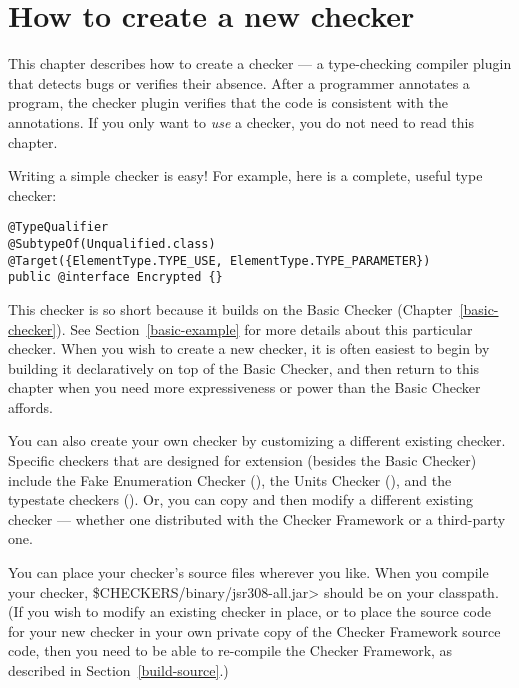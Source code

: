 \htmlhr
\chapter{How to create a new checker\label{writing-a-checker}}

\newcommand{\TreeAPIBase}{http://docs.oracle.com/javase/7/docs/jdk/api/javac/tree/com/sun/source}
\newcommand{\refTreeclass}[2]{\ahref{\TreeAPIBase{}/#1/#2.html?is-external=true}{\<#2>}}
\newcommand{\ModelAPIBase}{http://docs.oracle.com/javase/7/docs/api/javax/lang/model}
\newcommand{\refModelclass}[2]{\ahref{\ModelAPIBase{}/#1/#2.html?is-external=true}{\<#2>}}

This chapter describes how to create a checker
--- a type-checking compiler plugin that detects bugs or verifies their
absence.  After a programmer annotates a program,
the checker plugin verifies that the code is consistent
with the annotations.
If you only want to \emph{use} a checker, you do not need to read this
chapter.

Writing a simple checker is easy!  For example, here is a complete, useful
type checker:

\begin{Verbatim}
@TypeQualifier
@SubtypeOf(Unqualified.class)
@Target({ElementType.TYPE_USE, ElementType.TYPE_PARAMETER})
public @interface Encrypted {}
\end{Verbatim}

This checker is so short because it builds on the Basic Checker
(Chapter~\ref{basic-checker}).
See Section~\ref{basic-example} for more details about this particular checker.
When you wish to create a new checker, it is often easiest to begin by
building it declaratively on top of the Basic Checker, and then return to
this chapter when you need more expressiveness or power than the Basic
Checker affords.

You can also create your own checker by customizing a different existing
checker.  Specific checkers that are designed for extension (besides the Basic
Checker) include the Fake Enumeration Checker
(), the Units Checker
(), and the typestate checkers
().
Or, you can copy and then modify a different existing checker --- whether
one distributed with the Checker Framework or a third-party one.

You can place your checker's source files wherever you like.  When you
compile your checker, \<\$CHECKERS/binary/jsr308-all.jar> should be on your
classpath.  (If you wish to modify an existing checker in place, or to
place the source code for your new checker in your own private copy of the
Checker Framework source code, then you need to be able to re-compile the
Checker Framework, as described in Section~\ref{build-source}.)

